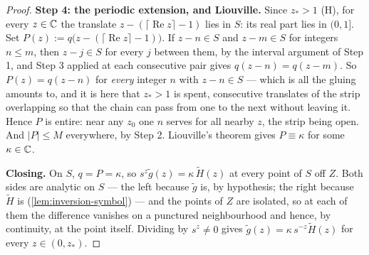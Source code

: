 \begin{proof}
\textbf{Step 4: the periodic extension, and Liouville.} Since $z_* > 1$ (H), for every $z \in \mathbb{C}$
the translate $z - (\lceil \operatorname{Re} z\rceil - 1)$ lies in $S$: its real part lies in $(0,1]$.
Set $P(z) := q\bigl(z - (\lceil \operatorname{Re} z\rceil - 1)\bigr)$. If $z - n \in S$ and
$z - m \in S$ for integers $n \le m$, then $z - j \in S$ for every $j$ between them, by the interval
argument of Step 1, and Step 3 applied at each consecutive pair gives $q(z-n) = q(z-m)$. So
$P(z) = q(z-n)$ for \emph{every} integer $n$ with $z - n \in S$ --- which is all the gluing amounts
to, and it is here that $z_* > 1$ is spent, consecutive translates of the strip overlapping so that
the chain can pass from one to the next without leaving it. Hence $P$ is entire: near any $z_0$ one
$n$ serves for all nearby $z$, the strip being open. And $|P| \le M$ everywhere, by Step 2.
Liouville's theorem gives $P \equiv \kappa$ for some $\kappa \in \mathbb{C}$.

\textbf{Closing.} On $S$, $q = P = \kappa$, so $s^z\tilde g(z) = \kappa\,\tilde H(z)$ at every point
of $S$ off $Z$. Both sides are analytic on $S$ --- the left because $\tilde g$ is, by hypothesis;
the right because $\tilde H$ is (\ref{lem:inversion-symbol}) --- and the points of $Z$ are isolated,
so at each of them the difference vanishes on a punctured neighbourhood and hence, by continuity, at
the point itself. Dividing by $s^z \ne 0$ gives
$\tilde g(z) = \kappa\,s^{-z}\tilde H(z)$ for every $z \in (0,z_*)$.
\end{proof}

